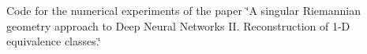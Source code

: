 Code for the numerical experiments of the paper \char`\"{}\+A singular Riemannian geometry approach to Deep Neural Networks I\+I. Reconstruction of 1-\/\+D equivalence classes.\char`\"{} 